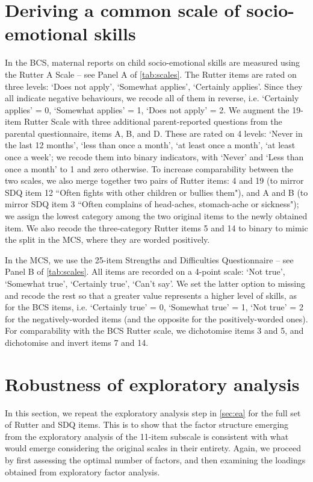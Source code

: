 
\section{Deriving a common scale of socio-emotional skills}\label{asec:scales}

In the BCS, maternal reports on child socio-emotional skills are measured using the Rutter A Scale \citep{Rutter1970} -- see Panel A of \autoref{tab:scales}. The Rutter items are rated on three levels: `Does not apply', `Somewhat applies', `Certainly applies'. Since they all indicate negative behaviours, we recode all of them in reverse, i.e. `Certainly applies' = 0, `Somewhat applies' = 1, `Does not apply' = 2. We augment the 19-item Rutter Scale with three additional parent-reported questions from the parental questionnaire, items A, B, and D. These are rated on 4 levels: `Never in the last 12 months', `less than once a month', `at least once a month', `at least once a week'; we recode them into binary indicators, with `Never' and `Less than once a month' to 1 and zero otherwise. To increase comparability between the two scales, we also merge together two pairs of Rutter items: 4 and 19 (to mirror SDQ item 12 ``Often fights with other children or bullies them"), and A and B (to mirror SDQ item 3 ``Often complains of head-aches, stomach-ache or sickness"); we assign the lowest category among the two original items to the newly obtained item. We also recode the three-category Rutter items 5 and 14 to binary to mimic the split in the MCS, where they are worded positively. 

In the MCS, we use the 25-item Strengths and Difficulties Questionnaire \citep{Goodman1997} -- see Panel B of \autoref{tab:scales}. All items are recorded on a 4-point scale: `Not true', `Somewhat true', `Certainly true', `Can't say'. We set the latter option to missing and recode the rest so that a greater value represents a higher level of skills, as for the BCS items, i.e. `Certainly true' = 0, `Somewhat true' = 1, `Not true' = 2 for the negatively-worded items (and the opposite for the positively-worded ones). For comparability with the BCS Rutter scale, we dichotomise items 3 and 5, and dichotomise and invert items 7 and 14.

\section{Robustness of exploratory analysis}\label{asec:fullefa}

In this section, we repeat the exploratory analysis step in \autoref{sec:ea} for the full set of Rutter and SDQ items. This is to show that the factor structure emerging from the exploratory analysis of the 11-item subscale is consistent with what would emerge considering the original scales in their entirety. Again, we proceed by first assessing the optimal number of factors, and then examining the loadings obtained from exploratory factor analysis.

